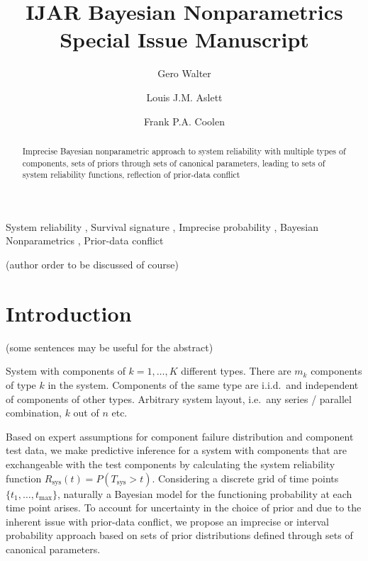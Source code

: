 \documentclass[authoryear, 12pt, a4paper]{elsarticle}
\newcommand{\Rsys}{R_\text{sys}}
\def\Tsys{T_\text{sys}}
\def\tmax{t_\text{max}}
\begin{document}

\begin{frontmatter}
\title{IJAR Bayesian Nonparametrics Special Issue Manuscript}

\author[ein]{Gero Walter}
\author[oxf]{Louis J.M. Aslett}
\author[dur]{Frank P.A. Coolen}

\address[ein]{School of Industrial Engineering, Eindhoven University of Technology, Eindhoven, NL}
\address[oxf]{Department of Statistics, University of Oxford, Oxford, UK}
\address[dur]{Department of Mathematical Sciences, Durham University, Durham, UK}


\begin{abstract}
Imprecise Bayesian nonparametric approach to system reliability with multiple types of components,
sets of priors through sets of canonical parameters,
leading to sets of system reliability functions,
reflection of prior-data conflict
\end{abstract}

\begin{keyword}
System reliability \sep
Survival signature \sep
Imprecise probability \sep
Bayesian Nonparametrics \sep
Prior-data conflict
\end{keyword}
\end{frontmatter}



(author order to be discussed of course)

\section{Introduction}

(some sentences may be useful for the abstract)

System with components of $k=1,\ldots,K$ different types.
There are $m_k$ components of type $k$ in the system.
Components of the same type are i.i.d.\ and independent of components of other types.
Arbitrary system layout, i.e.\ any series / parallel combination, $k$ out of $n$ etc.

Based on expert assumptions for component failure distribution and component test data,
we make predictive inference for a system with components that are exchangeable
with the test components by calculating the system reliability function $\Rsys(t) = P(\Tsys > t)$.
Considering a discrete grid of time points $\{t_1, \ldots, \tmax\}$,
naturally a Bayesian model for the functioning probability at each time point arises.
To account for uncertainty in the choice of prior and due to the inherent issue with prior-data conflict,
we propose an imprecise or interval probability approach
based on sets of prior distributions defined through sets of canonical parameters.
\end{document}
